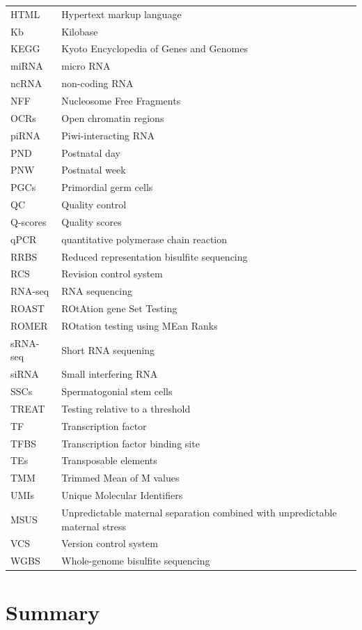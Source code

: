 \documentclass[12pt,twoside]{reedthesis}
\begin{document}
\begin{longtable}[]{@{}
  >{\raggedright\arraybackslash}p{}
  >{\raggedright\arraybackslash}p{}@{}}
HTML & Hypertext markup language \\
Kb & Kilobase \\
KEGG & Kyoto Encyclopedia of Genes and Genomes \\
miRNA & micro RNA \\
ncRNA & non-coding RNA \\
NFF & Nucleosome Free Fragments \\
OCRs & Open chromatin regions \\
piRNA & Piwi-interacting RNA \\
PND & Postnatal day \\
PNW & Postnatal week \\
PGCs & Primordial germ cells \\
QC & Quality control \\
Q-scores & Quality scores \\
qPCR & quantitative polymerase chain reaction \\
RRBS & Reduced representation bisulfite sequencing \\
RCS & Revision control system \\
RNA-seq & RNA sequencing \\
ROAST & ROtAtion gene Set Testing \\
ROMER & ROtation testing using MEan Ranks \\
sRNA-seq & Short RNA sequening \\
siRNA & Small interfering RNA \\
SSCs & Spermatogonial stem cells \\
TREAT & Testing relative to a threshold \\
TF & Transcription factor \\
TFBS & Transcription factor binding site \\
TEs & Transposable elements \\
TMM & Trimmed Mean of M values \\
UMIs & Unique Molecular Identifiers \\
MSUS & Unpredictable maternal separation combined with unpredictable maternal stress \\
VCS & Version control system \\
WGBS & Whole-genome bisulfite sequencing \\
\bottomrule
\end{longtable}
\hypertarget{summary}{%
\chapter*{Summary}\label{summary}}
\end{document}
